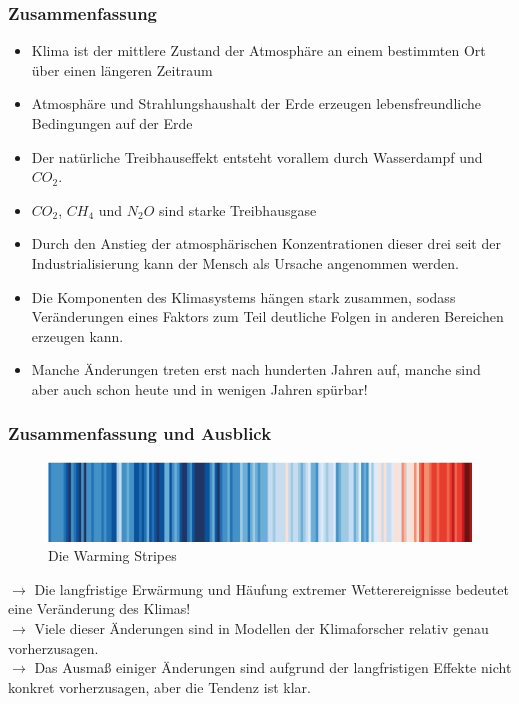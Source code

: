 \begin{frame}
	\frametitle{Zusammenfassung}
	\begin{itemize}
		\item Klima ist der mittlere Zustand der Atmosphäre an einem bestimmten Ort über einen längeren Zeitraum
		\item Atmosphäre und Strahlungshaushalt der Erde erzeugen lebensfreundliche Bedingungen auf der Erde
		\item Der natürliche Treibhauseffekt entsteht vorallem durch Wasserdampf und $CO_2$.
		\item $CO_2$, $CH_4$ und $N_2O$ sind starke Treibhausgase
		\item Durch den Anstieg der atmosphärischen Konzentrationen dieser drei seit der Industrialisierung kann der Mensch als Ursache angenommen werden.
		\item Die Komponenten des Klimasystems hängen stark zusammen, sodass Veränderungen eines Faktors zum Teil deutliche Folgen in anderen Bereichen erzeugen kann.
		\item Manche Änderungen treten erst nach hunderten Jahren auf, manche sind aber auch schon heute und in wenigen Jahren spürbar!
	\end{itemize}
\end{frame}

\begin{frame}
	\frametitle{Zusammenfassung und Ausblick}
	\begin{figure}
		\centering
		\includegraphics[width=\linewidth]{bilder/s4f-warming-stripes}
		\caption{Die Warming Stripes}
	\end{figure}
	$\rightarrow$ Die langfristige Erwärmung und Häufung extremer Wetterereignisse bedeutet eine Veränderung des Klimas!\\
	$\rightarrow$ Viele dieser Änderungen sind in Modellen der Klimaforscher relativ genau vorherzusagen. \\
	$\rightarrow$ Das Ausmaß einiger Änderungen sind aufgrund der langfristigen Effekte nicht konkret vorherzusagen, aber die Tendenz ist klar.
\end{frame}

